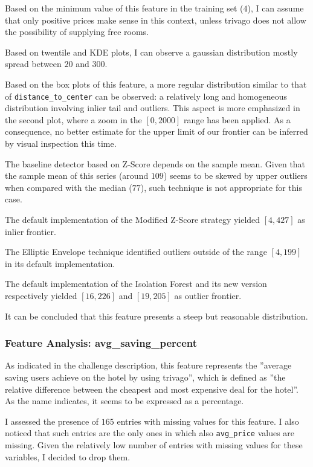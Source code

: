 \documentclass[preprint,12pt,3p]{elsarticle}
\begin{document}
Based on the minimum value of this feature in the training set ($4$), I can assume that only positive prices make sense in this context, unless trivago does not allow the possibility of supplying free rooms.

Based on twentile and KDE plots, I can observe a gaussian distribution mostly spread between $20$ and $300$.

Based on the box plots of this feature, a more regular distribution similar to that of \verb|distance_to_center| can be observed: a relatively long and homogeneous distribution involving inlier tail and outliers. This aspect is more emphasized in the second plot, where a zoom in the $[0,2000]$ range has been applied. As a consequence, no better estimate for the upper limit of our frontier can be inferred by visual inspection this time.

The baseline detector based on Z-Score depends on the sample mean. Given that the sample mean of this series (around $109$) seems to be skewed by upper outliers when compared with the median ($77$), such technique is not appropriate for this case.

The default implementation of the Modified Z-Score strategy yielded $[4,427]$ as inlier frontier.

The Elliptic Envelope technique identified outliers outside of the range $[4,199]$ in its default implementation.

The default implementation of the Isolation Forest and its new version respectively yielded $[16,226]$ and $[19,205]$ as outlier frontier.

It can be concluded that this feature presents a steep but reasonable distribution.

\subsubsection{Feature Analysis: avg\_saving\_percent}
As indicated in the challenge description, this feature represents the ''average saving users achieve on the hotel by using trivago'', which is defined as ''the relative difference between the cheapest and most expensive deal for the hotel''. As the name indicates, it seems to be expressed as a percentage.

I assessed the presence of $165$ entries with missing values for this feature. I also noticed that such entries are the only ones in which also \verb|avg_price| values are missing. Given the relatively low number of entries with missing values for these variables, I decided to drop them.
\end{document}
